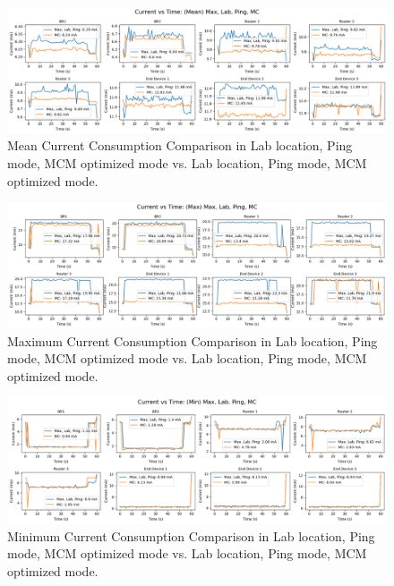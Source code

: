 \begin{figure}[H]
  \centering
  \includegraphics[width=1\textwidth]{images/research_results/current_consumption_analysis/optimized/lab/ping/mc/comparison/mean_comparison_lab_ping_mc_vs_lab_ping_mc.png}
    \caption{Mean Current Consumption Comparison in Lab location, Ping mode, MCM optimized mode vs. Lab location, Ping mode, MCM optimized mode.}
    \label{fig:mean_comparison_lab_ping_mc_vs_lab_ping_mc}
\end{figure}

\begin{figure}[H]
  \centering
  \includegraphics[width=1\textwidth]{images/research_results/current_consumption_analysis/optimized/lab/ping/mc/comparison/max_comparison_lab_ping_mc_vs_lab_ping_mc.png}
    \caption{Maximum Current Consumption Comparison in Lab location, Ping mode, MCM optimized mode vs. Lab location, Ping mode, MCM optimized mode.}
    \label{fig:max_comparison_lab_ping_mc_vs_lab_ping_mc}
\end{figure}

\begin{figure}[H]
  \centering
  \includegraphics[width=1\textwidth]{images/research_results/current_consumption_analysis/optimized/lab/ping/mc/comparison/min_comparison_lab_ping_mc_vs_lab_ping_mc.png}
    \caption{Minimum Current Consumption Comparison in Lab location, Ping mode, MCM optimized mode vs. Lab location, Ping mode, MCM optimized mode.}
    \label{fig:min_comparison_lab_ping_mc_vs_lab_ping_mc}
\end{figure}

